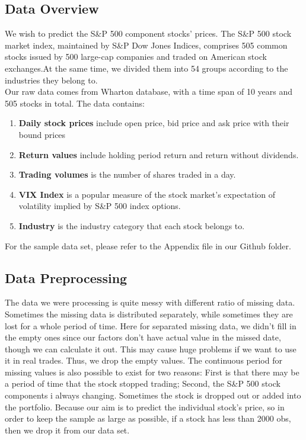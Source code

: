 \documentclass[fleqn,10pt]{SelfArx} %
\begin{document}
\subsection{Data Overview}
We wish to predict the S\&P 500 component stocks' prices. The S\&P 500 stock market index, maintained by S\&P Dow Jones Indices, comprises 505 common stocks issued by 500 large-cap companies and traded on American stock exchanges.At the same time, we divided them into 54 groups according to the industries they belong to. \\ 
\newline
\noindent
Our raw data comes from Wharton database, with a time span of 10 years and 505 stocks in total. The data contains:
\begin{enumerate}%
    \item \textbf{Daily stock prices} include open price, bid price and ask price with their bound prices
    \item \textbf{Return values} include holding period return and return without dividends.
    \item \textbf{Trading volumes} is the number of shares traded in a day.
    \item \textbf{VIX Index} is a popular measure of the stock market's expectation of volatility implied by S&P 500 index options.
    \item \textbf{Industry} is the industry category that each stock belongs to.
\end{enumerate}
\noindent
For the sample data set, please refer to the Appendix file in our Github folder. 
 


\subsection{Data Preprocessing}
\noindent
The data we were processing is quite messy with different ratio of missing data. Sometimes the missing data is distributed separately, while sometimes they are lost for a whole period of time. Here for separated missing data, we didn't fill in the empty ones since our factors don't have actual value in the missed date, though we can calculate it out. This may cause huge problems if we want to use it in real trades. Thus, we drop the empty values. The continuous period for missing values is also possible to exist for two reasons: First is that there may be a period of time that the stock stopped trading; Second, the S\&P 500 stock components i always changing. Sometimes the stock is dropped out or added into the portfolio. Because our aim is to predict the individual stock's price, so in order to keep the sample as large as possible, if a stock has less than 2000 obs, then we drop it from our data set. \\
\end{document}
